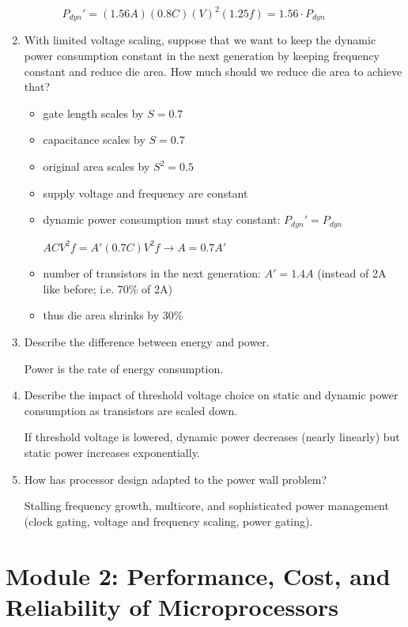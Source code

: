 \documentclass[12pt]{article}
\begin{document}
\begin{enumerate}
\begin{itemize}
\begin{itemize}
                $P_{dyn}' = (1.56A)(0.8C)(V)^2(1.25f) = 1.56 \cdot P_{dyn}$
            \end{itemize}
        \end{itemize}

        \item With limited voltage scaling, suppose that we want to keep the dynamic power consumption constant in the next generation by keeping frequency constant and reduce die area. How much should we reduce die area to achieve that?
        \begin{itemize}
            \item gate length scales by $S = 0.7$
            \item capacitance scales by $S = 0.7$
            \item original area scales by $S^2 = 0.5$
            \item supply voltage and frequency are constant
            \item dynamic power consumption must stay constant: $P_{dyn}' = P_{dyn}$

            $ACV^2f = A'(0.7C)V^2f \longrightarrow A = 0.7A'$

            \item number of transistors in the next generation: $A' = 1.4A$ (instead of 2A like before; i.e. 70\% of 2A)
            \item thus die area shrinks by 30\%
        \end{itemize}

        \item Describe the difference between energy and power.

        Power is the rate of energy consumption.

        \item Describe the impact of threshold voltage choice on static and dynamic power consumption as transistors are scaled down.

        If threshold voltage is lowered, dynamic power decreases (nearly linearly) but static power increases exponentially.

        \item How has processor design adapted to the power wall problem?

        Stalling frequency growth, multicore, and sophisticated power management (clock gating, voltage and frequency scaling, power gating).
    \end{enumerate}

    \section{Module 2: Performance, Cost, and Reliability of Microprocessors}
\end{document}
